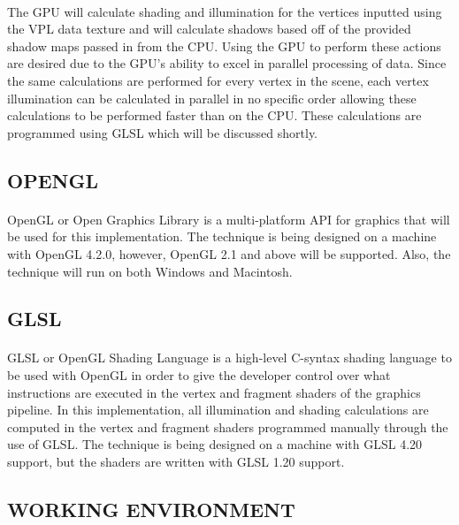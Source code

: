 \paragraph{}
The GPU will calculate shading and illumination for the vertices inputted using the VPL data texture and will calculate shadows based off of the provided shadow maps passed in from the CPU.  Using the GPU to perform these actions are desired due to the GPU's ability to excel in parallel processing of data.  Since the same calculations are performed for every vertex in the scene, each vertex illumination can be calculated in parallel in no specific order allowing these calculations to be performed faster than on the CPU.  These calculations are programmed using GLSL which will be discussed shortly.

\subsection{OPENGL}
\paragraph{}
OpenGL or Open Graphics Library is a multi-platform API for graphics that will be used for this implementation.  The technique is being designed on a machine with OpenGL 4.2.0, however, OpenGL 2.1 and above will be supported.  Also, the technique will run on both Windows and Macintosh.

\subsection{GLSL}
\paragraph{}
GLSL or OpenGL Shading Language is a high-level C-syntax shading language to be used with OpenGL in order to give the developer control over what instructions are executed in the vertex and fragment shaders of the graphics pipeline.  In this implementation, all illumination and shading calculations are computed in the vertex and fragment shaders programmed manually through the use of GLSL.  The technique is being designed on a machine with GLSL 4.20 support, but the shaders are written with GLSL 1.20 support.

\subsection{WORKING ENVIRONMENT}
